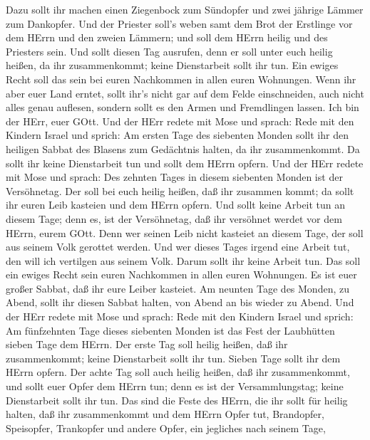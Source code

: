  Dazu sollt ihr machen einen Ziegenbock zum Sündopfer und
zwei jährige Lämmer zum Dankopfer.  Und der Priester soll's
weben samt dem Brot der Erstlinge vor dem HErrn und den zweien Lämmern;
und soll dem HErrn heilig und des Priesters sein.  Und
sollt diesen Tag ausrufen, denn er soll unter euch heilig heißen, da ihr
zusammenkommt; keine Dienstarbeit sollt ihr tun. Ein ewiges Recht soll
das sein bei euren Nachkommen in allen euren Wohnungen. 
Wenn ihr aber euer Land erntet, sollt ihr's nicht gar auf dem Felde
einschneiden, auch nicht alles genau auflesen, sondern sollt es den
Armen und Fremdlingen lassen. Ich bin der HErr, euer GOtt. 
Und der HErr redete mit Mose und sprach:  Rede mit den
Kindern Israel und sprich: Am ersten Tage des siebenten Monden sollt ihr
den heiligen Sabbat des Blasens zum Gedächtnis halten, da ihr
zusammenkommt.  Da sollt ihr keine Dienstarbeit tun und
sollt dem HErrn opfern.  Und der HErr redete mit Mose und
sprach:  Des zehnten Tages in diesem siebenten Monden ist
der Versöhnetag. Der soll bei euch heilig heißen, daß ihr zusammen
kommt; da sollt ihr euren Leib kasteien und dem HErrn opfern.
 Und sollt keine Arbeit tun an diesem Tage; denn es, ist
der Versöhnetag, daß ihr versöhnet werdet vor dem HErrn, eurem GOtt.
 Denn wer seinen Leib nicht kasteiet an diesem Tage, der
soll aus seinem Volk gerottet werden.  Und wer dieses Tages
irgend eine Arbeit tut, den will ich vertilgen aus seinem Volk.
 Darum sollt ihr keine Arbeit tun. Das soll ein ewiges
Recht sein euren Nachkommen in allen euren Wohnungen.  Es
ist euer großer Sabbat, daß ihr eure Leiber kasteiet. Am neunten Tage
des Monden, zu Abend, sollt ihr diesen Sabbat halten, von Abend an bis
wieder zu Abend.  Und der HErr redete mit Mose und sprach:
 Rede mit den Kindern Israel und sprich: Am fünfzehnten
Tage dieses siebenten Monden ist das Fest der Laubhütten sieben Tage dem
HErrn.  Der erste Tag soll heilig heißen, daß ihr
zusammenkommt; keine Dienstarbeit sollt ihr tun.  Sieben
Tage sollt ihr dem HErrn opfern. Der achte Tag soll auch heilig heißen,
daß ihr zusammenkommt, und sollt euer Opfer dem HErrn tun; denn es ist
der Versammlungstag; keine Dienstarbeit sollt ihr tun.  Das
sind die Feste des HErrn, die ihr sollt für heilig halten, daß ihr
zusammenkommt und dem HErrn Opfer tut, Brandopfer, Speisopfer,
Trankopfer und andere Opfer, ein jegliches nach seinem Tage,
